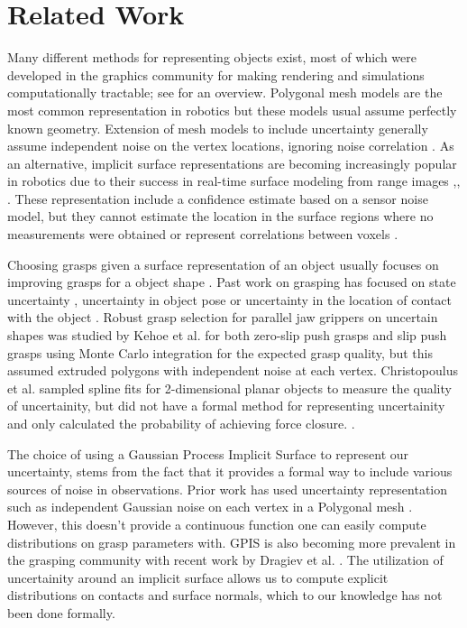 \documentclass[letterpaper, 10 pt, conference]{ieeeconf}  %
\begin{document}

\section{Related Work}
Many different methods for representing objects exist, most of which were developed in the graphics community for making rendering and simulations computationally tractable; see \cite{van2014computer} for an overview. Polygonal mesh models are the most common representation in robotics but these models usual assume perfectly known geometry. Extension of mesh models to include  uncertainty generally assume independent noise on the vertex locations, ignoring noise correlation \cite{kehoe2012toward}. As an alternative, implicit surface representations are becoming increasingly popular in robotics due to their success in real-time surface modeling from range images \cite{curless1996volumetric},\cite{newcombe2011kinectfusion}, \cite{hornung2013octomap}. These representation include a confidence estimate based on a sensor noise model, but they cannot estimate the location in the surface regions where no measurements were obtained or represent correlations between voxels \cite{curless1996volumetric}. 

Choosing grasps given a surface representation of an object usually focuses on improving grasps for a  object shape \cite{ferrari1992}. Past work on grasping has focused on state uncertainty \cite{goldberg1990bayesian}\cite{goldberg1990stochastic} \cite{stulp2011learning},  uncertainty in object pose \cite{christopoulos2007handling}  \cite{felip2009robust} \cite{kim2012physically} or uncertainty in the location of contact with the object \cite{zheng2005}. Robust grasp selection for parallel jaw grippers on uncertain shapes was studied by Kehoe et al. for both zero-slip push grasps \cite{kehoe2012toward} and slip push grasps \cite{kehoe2012estimating} using Monte Carlo integration for the expected grasp quality, but this assumed extruded polygons with independent noise at each vertex. Christopoulus et al. sampled spline fits for 2-dimensional planar objects to measure the quality of uncertainity, but did not have a formal method for representing uncertainity and only calculated the probability of achieving force closure. . 


The choice of using a Gaussian Process Implicit Surface to represent our uncertainty, stems from the fact that it provides a formal way to include various sources of noise in observations. Prior work has used uncertainty representation such as independent Gaussian noise on each vertex in a Polygonal mesh \cite{kehoe2012toward}. However, this doesn't provide a continuous function one can easily compute distributions on grasp parameters with. GPIS is also becoming more prevalent in the grasping community with recent work by Dragiev et al. \cite{dragiev2011} . The utilization of uncertainity around an implicit surface allows us to compute explicit distributions on contacts and surface normals, which to our knowledge has not been done formally. 
\end{document}
